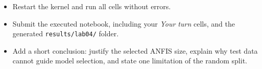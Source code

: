 \begin{labdeliverable}
\begin{itemize}
  \item Restart the kernel and run all cells without errors.
  \item Submit the executed notebook, including your \emph{Your turn} cells, and the generated \texttt{results/lab04/} folder.
  \item Add a short conclusion: justify the selected ANFIS size, explain why test data cannot guide model selection, and state one limitation of the random split.
\end{itemize}
\end{labdeliverable}
